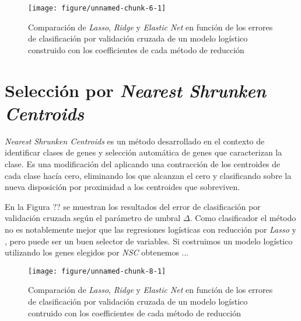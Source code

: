 \documentclass[a4paper]{article}\usepackage[]{graphicx}\usepackage[]{color}
\makeatletter
\def\maxwidth{ %
  \ifdim\Gin@nat@width>\linewidth
    \linewidth
  \else
    \Gin@nat@width
  \fi
}
\newenvironment{knitrout}{}{} %
\makeatother
\begin{document}
\begin{figure}[t]
\begin{knitrout}
\color{fgcolor}

{\centering \texttt{[image: figure/unnamed-chunk-6-1]} 

}



\end{knitrout}

\caption{Comparación de \textit{Lasso}, \textit{Ridge} y \textit{Elastic Net} en función de los errores de clasificación por validación cruzada de un modelo logístico construido con los coefficientes de cada método de reducción}
\label{fig:lasso_comp}
\end{figure}




\section{Selección por \textit{Nearest Shrunken Centroids}}

\textit{Nearest Shrunken Centroids} es un método desarrollado en el contexto de identificar clases de genes y selección automática de genes que caracterizan la clase. Es una modificación del  aplicando una contracción de los centroides de cada clase hacía cero, eliminando los que alcanzan el cero y clasificando sobre la nueva disposición por proximidad a los centroides que sobreviven.  

En la Figura ?? se muestran los resultados del error de clasificación por validación cruzada según el parámetro de umbral $\Delta$. Como clasificador el método no es notablemente mejor que las regresiones logísticas con reducción por \textit{Lasso} y , pero puede ser un buen selector de variables. Si costruimos un modelo logístico utilizando los genes elegidos por \textit{NSC} obtenemos ...

\begin{figure}[b]
\begin{knitrout}
\color{fgcolor}

{\centering \texttt{[image: figure/unnamed-chunk-8-1]} 

}



\end{knitrout}
\caption{Comparación de \textit{Lasso}, \textit{Ridge} y \textit{Elastic Net} en función de los errores de clasificación por validación cruzada de un modelo logístico contruido con los coefficientes de cada método de reducción}
\label{fig:lasso_comp}
\end{figure}
\end{document}
